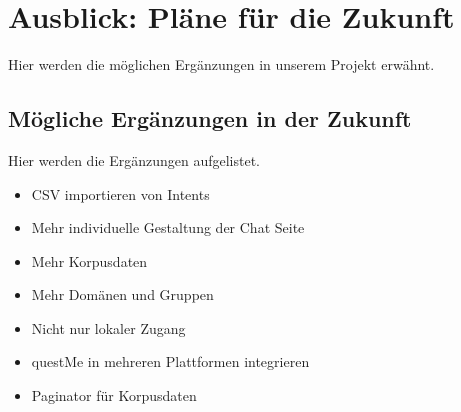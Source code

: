 \section{Ausblick: Pläne für die Zukunft}
Hier werden die möglichen Ergänzungen in unserem Projekt erwähnt.

\subsection{Mögliche Ergänzungen in der Zukunft}
Hier werden die Ergänzungen aufgelistet.

\begin{itemize}
    \item CSV importieren von Intents
    \item Mehr individuelle Gestaltung der Chat Seite
    \item Mehr Korpusdaten 
    \item Mehr Domänen und Gruppen
    \item Nicht nur lokaler Zugang
    \item questMe in mehreren Plattformen integrieren
    \item Paginator für Korpusdaten
\end{itemize}